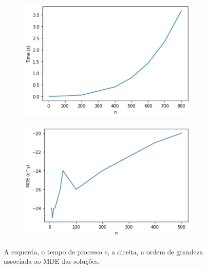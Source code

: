 \documentclass[a4paper,12pt]{article}
\begin{document}
	\begin{figure}[H]
		\begin{center}
			\begin{minipage}{0.45 \linewidth}
				\begin{figure}[H]
					\begin{center}
						\includegraphics[width=1\linewidth]{figures/tempoTriPri.png}
					\end{center}
				\end{figure}
			\end{minipage}
			\hspace{0.1cm}
			\begin{minipage}{0.45 \linewidth}
				
				\begin{figure}[H]
					\begin{center}
						\includegraphics[width=1\linewidth]{figures/mdeTriPro.png}
					\end{center}
					\label{fig:mdeTri}
				\end{figure}
			\end{minipage}
		\end{center}
		\caption{A esquerda, o tempo de processo e, a direita, a ordem de grandeza associada ao MDE das soluções.}
		\label{fig:triPri}
	\end{figure}
	
\end{document}
